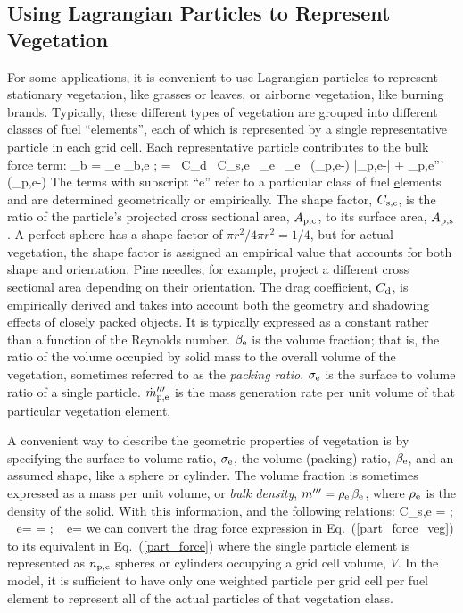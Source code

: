 \subsection{Using Lagrangian Particles to Represent Vegetation}

For some applications, it is convenient to use Lagrangian particles to represent stationary vegetation, like grasses or leaves, or airborne vegetation, like burning brands. Typically, these different types of vegetation are grouped into different classes of fuel ``elements'', each of which is represented by a single representative particle in each grid cell. Each representative particle contributes to the bulk force term:
\be
    {\bof_{\rm b}} = \sum_{\rm e} {\bof_{\rm b,e}} \quad ;  =  \, C_{\rm d} \, C_{\rm s,e} \,  \beta_{\rm e} \, \sigma_{\rm e} \, (\bu_{\rm p,e}-\bu) |\bu_{\rm p,e}-\bu| + _{\rm p,e}''' \, (\bu_{\rm p,e}-\bu)   \label{part_force_veg}
\ee
The terms with subscript ``e'' refer to a particular class of fuel \underline{e}lements and are determined geometrically or empirically.  The shape factor, $C_{\rm s,e}$, is the ratio of the particle's projected cross sectional area, $A_{\rm p,c}$, to its surface area, $A_{\rm p,s}$. A perfect sphere has a shape factor of $\pi r^2/4 \pi r^2=1/4$, but for actual vegetation, the shape factor is assigned an empirical value that accounts for both shape and orientation. Pine needles, for example, project a different cross sectional area depending on their orientation. The drag coefficient, $C_{\rm d}$, is empirically derived and takes into account both the geometry and shadowing effects of closely packed objects. It is typically expressed as a constant rather than a function of the Reynolds number.  $\beta_{\rm e}$ is the volume fraction; that is, the ratio of the volume occupied by solid mass to the overall volume of the vegetation, sometimes referred to as the {\em packing ratio}. $\sigma_{\rm e}$ is the surface to volume ratio of a single particle. $\dot{m}_{\rm p,e}'''$ is the mass generation rate per unit volume of that particular vegetation element.

A convenient way to describe the geometric properties of vegetation is by specifying the surface to volume ratio, $\sigma_{\rm e}$, the volume (packing) ratio, $\beta_{\rm e}$, and an assumed shape, like a sphere or cylinder. The volume fraction is sometimes expressed as a mass per unit volume, or {\em bulk density}, $m'''=\rho_{\rm e} \, \beta_{\rm e}$, where $\rho_{\rm e}$ is the density of the solid. With this information, and the following relations:
\be
   C_{\rm s,e} =  \quad ; \quad  \beta_{\rm e}= =  \quad ; \quad \sigma_{\rm e}=
\ee
we can convert the drag force expression in Eq.~(\ref{part_force_veg}) to its equivalent in Eq.~(\ref{part_force}) where the single particle element is represented as $n_{\rm p,e}$ spheres or cylinders occupying a grid cell volume, $V$. In the model, it is sufficient to have only one weighted particle per grid cell per fuel element to represent all of the actual particles of that vegetation class.

